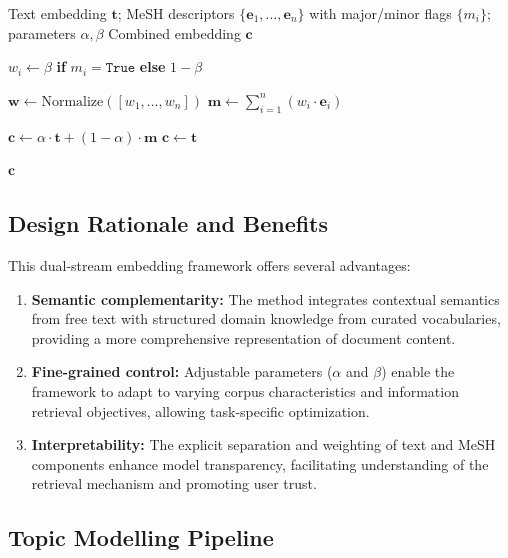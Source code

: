 \documentclass[authorproof,JACIII,researchpaper]{fujipressarticle}
\begin{document}
\begin{algorithm}[H]
\caption{Text--MeSH Fusion with Major/Minor Weights}
\label{alg:mesh_fusion}
\begin{algorithmic}[1]
\Require Text embedding $\boldsymbol{t}$; MeSH descriptors $\{\boldsymbol{e}_1,\ldots,\boldsymbol{e}_n\}$ with major/minor flags $\{m_i\}$; parameters $\alpha,\beta$
\Ensure Combined embedding $\boldsymbol{c}$

    \State $w_i \gets \beta$ \textbf{if} $m_i = \texttt{True}$ \textbf{else} $1-\beta$
\EndFor

\State $\boldsymbol{w} \gets \mathrm{Normalize}([w_1,\ldots,w_n])$
\State $\boldsymbol{m} \gets \sum_{i=1}^{n} (w_i \cdot \boldsymbol{e}_i)$

    \State $\boldsymbol{c} \gets \alpha \cdot \boldsymbol{t} + (1-\alpha) \cdot \boldsymbol{m}$
\Else
    \State $\boldsymbol{c} \gets \boldsymbol{t}$
\EndIf

\State \Return $\boldsymbol{c}$
\end{algorithmic}
\end{algorithm}

\subsection{Design Rationale and Benefits}
This dual-stream embedding framework offers several advantages:
\begin{enumerate}[leftmargin=*,label=\arabic*)]
    \item \textbf{Semantic complementarity:} The method integrates contextual semantics from free text with structured domain knowledge from curated vocabularies, providing a more comprehensive representation of document content.

    \item \textbf{Fine-grained control:} Adjustable parameters ($\alpha$ and $\beta$) enable the framework to adapt to varying corpus characteristics and information retrieval objectives, allowing task-specific optimization.

    \item \textbf{Interpretability:} The explicit separation and weighting of text and MeSH components enhance model transparency, facilitating understanding of the retrieval mechanism and promoting user trust.
\end{enumerate}

\subsection{Topic Modelling Pipeline}
\end{document}
